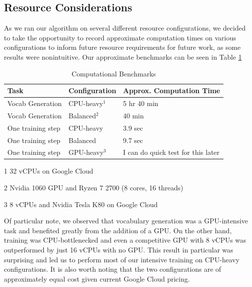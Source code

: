 \documentclass[11pt]{article}
\begin{document}
\begin{appendices}

\section{Resource Considerations}

As we ran our algorithm on several different resource configurations, we decided to take the opportunity to record approximate computation times on various configurations to inform future resource requirements for future work, as some results were nonintuitive. Our approximate benchmarks can be seen in Table \ref{table:hardware}

\begin{table}[h!]
\begin{threeparttable}
\centering
\begin{small}
\begin{tabular}{|p{2cm}|p{2.2cm}|p{2cm}|} 
 \hline
 Task & Configuration & Approx. Computation Time \\ [0.5ex] 
 \hline\hline
 Vocab Generation & CPU-heavy$^{1}$ & 5 hr 40 min \\ 
 Vocab Generation & Balanced$^{2}$ & 40 min \\
 \hline
 One training step & CPU-heavy & 3.9 sec \\
 One training step & Balanced & 9.7 sec \\ 
 One training step & GPU-heavy$^{3}$ & I can do quick test for this later \\[1ex]
 \hline
\end{tabular}
\end{small}
\begin{tablenotes}\footnotesize
\item[1] 32 vCPUs on Google Cloud
\item[2] Nvidia 1060 GPU and Ryzen 7 2700 (8 cores, 16 threads)
\item[3] 8 vCPUs and Nvidia Tesla K80 on Google Cloud
\end{tablenotes}
\caption{Computational Benchmarks}
\end{threeparttable}
\label{table:hardware}
\end{table}

Of particular note, we observed that vocabulary generation was a GPU-intensive task and benefited greatly from the addition of a GPU. On the other hand, training was CPU-bottlenecked and even a competitive GPU with 8 vCPUs was outperformed by just 16 vCPUs with no GPU. This result in particular was surprising and led us to perform most of our intensive training on CPU-heavy configurations. It is also worth noting that the two configurations are of approximately equal cost given current Google Cloud pricing.

\end{appendices}
\end{document}
